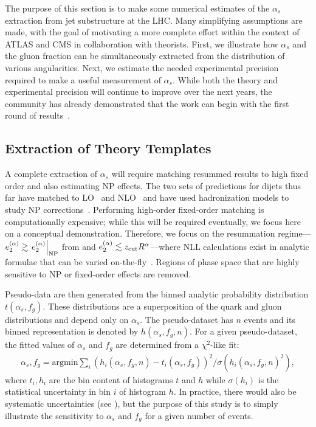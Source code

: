 
The purpose of this section is to make some numerical estimates of the $\alpha_s$ extraction from jet substructure at the LHC.
%
Many simplifying assumptions are made, with the goal of motivating a more complete effort within the context of ATLAS and CMS in collaboration with theorists.
%
First, we illustrate how $\alpha_s$ and the gluon fraction can be simultaneously extracted from the distribution of various angularities.
%
Next, we estimate the needed experimental precision required to make a useful measurement of $\alpha_s$.
%
While both the theory and experimental precision will continue to improve over the next years, the community has already demonstrated that the work can begin with the first round of results~\cite{Aaboud:2017qwh,CMS-PAS-SMP-16-010,Frye:2016aiz,Frye:2016okc,Marzani:2017mva,Marzani:2017kqd}.

\subsection{Extraction of Theory Templates}
\label{sec:templates}

A complete extraction of $\alpha_s$ will require matching resummed results to high fixed order and also estimating NP effects.
%
The two sets of predictions for dijets thus far have matched to LO~\cite{Frye:2016aiz,Frye:2016okc} and NLO~\cite{Marzani:2017mva,Marzani:2017kqd} and have used hadronization models to study NP corrections~\cite{Marzani:2017mva,Marzani:2017kqd}.
%
Performing high-order fixed-order matching is computationally expensive; while this will be required eventually, we focus here on a conceptual demonstration.
%
Therefore, we focus on the resummation regime---$e_{2}^{(\alpha)}\gtrsim \left. e_{2}^{(\alpha)} \right |_{\text{NP}}$ from  and $e_{2}^{(\alpha)}\lesssim z_\text{cut}R^\alpha$---where NLL calculations exist in analytic formulae that can be varied on-the-fly~\cite{Marzani:2017mva,Marzani:2017kqd}.
%
Regions of phase space that are highly sensitive to NP or fixed-order effects are removed.

Pseudo-data are then generated from the binned analytic probability distribution $t(\alpha_s,f_g)$.
%
These distributions are a superposition of the quark and gluon distributions and depend only on $\alpha_s$.
%
The pseudo-dataset has $n$ events and its binned representation is denoted by $h(\alpha_s,f_g,n)$.
%
For a given pseudo-dataset, the fitted values of $\alpha_s$ and $f_g$ are determined from a $\chi^2$-like fit:
%
\begin{align}
\label{eq:chi2fit}
\alpha_s,f_g=\text{argmin} \sum_i (h_i(\alpha_s,f_g,n)-t_i(\alpha_s,f_g))^2/\sigma(h_i(\alpha_s,f_g,n)^2),
\end{align}
%
where $t_i, h_i$ are the bin content of histograms $t$ and $h$ while $\sigma(h_i)$ is the statistical uncertainty in bin $i$ of histogram $h$.
%
In practice, there would also be systematic uncertainties (see ), but the purpose of this study is to simply illustrate the sensitivity to $\alpha_s$ and $f_g$ for a given number of events.

